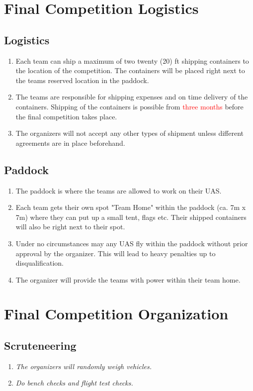     \section{Final Competition Logistics}
    \subsection{Logistics}
    \begin{enumerate}
      \item Each team can ship a maximum of two twenty (20) ft shipping containers to the location of the competition. The containers will be placed right next to the teams reserved location in the paddock.
      \item The teams are responsible for shipping expenses and on time delivery of the containers. Shipping of the containers is possible from \textcolor{red}{three months }before the final competition takes place.
      \item The organizers will not accept any other types of shipment unless different agreements are in place beforehand.
    \end{enumerate}

    \subsection{Paddock}
    \begin{enumerate}
      \item The paddock is where the teams are allowed to work on their UAS. 
      \item Each team gets their own spot "Team Home" within the paddock (ca. 7m x 7m) where they can put up a small tent, flags etc. Their shipped containers will also be right next to their spot. 
      \item Under no circumstances may any UAS fly within the paddock without prior approval by the organizer. This will lead to heavy penalties up to disqualification. 
      \item The organizer will provide the teams with power within their team home.    
    \end{enumerate}


    \section{Final Competition Organization}

    \subsection{Scruteneering}
    \begin{enumerate}
      \item \emph{The organizers will randomly weigh vehicles.}
      \item \emph{Do bench checks and flight test checks.}
    \end{enumerate}

